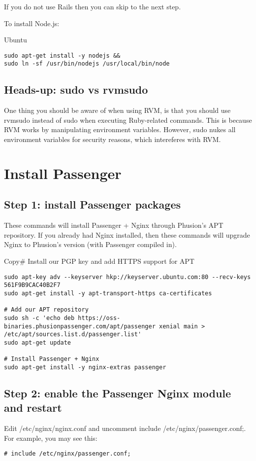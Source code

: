 \documentclass[11pt]{article}
\begin{document}
If you do not use Rails then you can skip to the next step.

To install Node.js:

Ubuntu
\begin{verbatim}
sudo apt-get install -y nodejs &&
sudo ln -sf /usr/bin/nodejs /usr/local/bin/node
\end{verbatim}

\subsection{Heads-up: sudo vs rvmsudo}
\label{sec:org81a8277}

One thing you should be aware of when using RVM, is that you should use rvmsudo instead of sudo when executing Ruby-related commands. This is because RVM works by manipulating environment variables. However, sudo nukes all environment variables for security reasons, which intereferes with RVM.

\section{Install Passenger}
\label{sec:orgceecb28}
\subsection{Step 1: install Passenger packages}
\label{sec:orgecbba8b}

These commands will install Passenger + Nginx through Phusion's APT repository. If you already had Nginx installed, then these commands will upgrade Nginx to Phusion's version (with Passenger compiled in).

Copy\# Install our PGP key and add HTTPS support for APT
\begin{verbatim}
sudo apt-key adv --keyserver hkp://keyserver.ubuntu.com:80 --recv-keys 561F9B9CAC40B2F7
sudo apt-get install -y apt-transport-https ca-certificates

# Add our APT repository
sudo sh -c 'echo deb https://oss-binaries.phusionpassenger.com/apt/passenger xenial main > /etc/apt/sources.list.d/passenger.list'
sudo apt-get update

# Install Passenger + Nginx
sudo apt-get install -y nginx-extras passenger
\end{verbatim}
\subsection{Step 2: enable the Passenger Nginx module and restart}
\label{sec:org3e83e79}
Edit /etc/nginx/nginx.conf and uncomment include /etc/nginx/passenger.conf;. For example, you may see this:
\begin{verbatim}
# include /etc/nginx/passenger.conf;
\end{verbatim}
\end{document}
